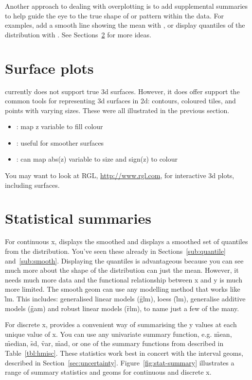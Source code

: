 Another approach to dealing with overplotting is to add supplemental summaries to help guide the eye to the true shape of or pattern within the data.  For examples, add a smooth line showing the mean with , or display quantiles of the distribution with .  See Sections~\ref{sec:summary} for more ideas.

\section{Surface plots}
\label{sec:surface}

\ggplot currently does not support true 3d surfaces.  However, it does offer support the common tools for representing 3d surfaces in 2d: contours, coloured tiles, and points with varying sizes.  These were all illustrated in the previous section.

\begin{itemize}
  \item {}: map z variable to fill colour
  \item {}: useful for smoother surfaces
  \item {}: can map abs(z) variable to size and sign(z) to colour
\end{itemize}

You may want to look at RGL, \url{http://www.rgl.com}, for interactive 3d plots, including surfaces.

\section{Statistical summaries}
\label{sec:summary}

For continuous x,  displays the smoothed and  displays a smoothed set of quantiles from the distribution.  You've seen these already in Sections~\ref{sub:quantile} and~\ref{sub:smooth}.  Displaying the quantiles is advantageous because you can see much more about the shape of the distribution can just the mean.  However, it needs much more data and the functional relationship between x and y is much more limited.  The smooth geom can use any modelling method that works like \f{lm}.  This includes: generalised linear models (\f{glm}), loess (\f{lm}), generalise additive models (\f{gam}) and robust linear models (\f{rlm}), to name just a few of the many.  

For discrete x,  provides a convenient way of summarising the y values at each unique value of x.  You can use any univariate summary function, e.g. \f{mean}, \f{median}, \f{sd}, \f{var}, \f{mad}, or one of the summary functions from  described in Table~\ref{tbl:hmisc}.  These statistics work best in concert with the interval geoms, described in Section~\ref{sec:uncertainty}.  Figure~\ref{fig:stat-summary} illustrates a range of summary statistics and geoms for continuous and discrete x.

